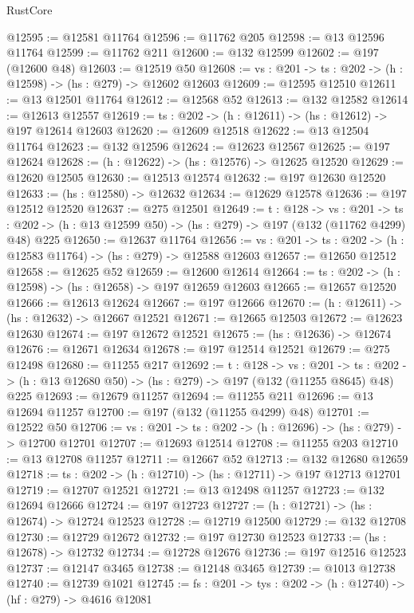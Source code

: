 \begin{lexlean}{RustCore}
\begin{coremodule}
@12595 := @12581 @11764
@12596 := @11762 @205
@12598 := @13 @12596 @11764
@12599 := @11762 @211
@12600 := @132 @12599
@12602 := @197 (@12600 @48)
@12603 := @12519 @50
@12608 := {vs : @201} -> {ts : @202} -> (h : @12598) -> (hs : @279) -> @12602 @12603
@12609 := @12595 @12510
@12611 := @13 @12501 @11764
@12612 := @12568 @52
@12613 := @132 @12582
@12614 := @12613 @12557
@12619 := {ts : @202} -> (h : @12611) -> (hs : @12612) -> @197 @12614 @12603
@12620 := @12609 @12518
@12622 := @13 @12504 @11764
@12623 := @132 @12596
@12624 := @12623 @12567
@12625 := @197 @12624
@12628 := (h : @12622) -> (hs : @12576) -> @12625 @12520
@12629 := @12620 @12505
@12630 := @12513 @12574
@12632 := @197 @12630 @12520
@12633 := (hs : @12580) -> @12632
@12634 := @12629 @12578
@12636 := @197 @12512 @12520
@12637 := @275 @12501
@12649 := {t : @128} ->
  {vs : @201} ->
  {ts : @202} -> (h : @13 @12599 @50) -> (hs : @279) -> @197 (@132 (@11762 @4299) @48) @225
@12650 := @12637 @11764
@12656 := {vs : @201} -> {ts : @202} -> (h : @12583 @11764) -> (hs : @279) -> @12588 @12603
@12657 := @12650 @12512
@12658 := @12625 @52
@12659 := @12600 @12614
@12664 := {ts : @202} -> (h : @12598) -> (hs : @12658) -> @197 @12659 @12603
@12665 := @12657 @12520
@12666 := @12613 @12624
@12667 := @197 @12666
@12670 := (h : @12611) -> (hs : @12632) -> @12667 @12521
@12671 := @12665 @12503
@12672 := @12623 @12630
@12674 := @197 @12672 @12521
@12675 := (hs : @12636) -> @12674
@12676 := @12671 @12634
@12678 := @197 @12514 @12521
@12679 := @275 @12498
@12680 := @11255 @217
@12692 := {t : @128} ->
  {vs : @201} ->
  {ts : @202} -> (h : @13 @12680 @50) -> (hs : @279) -> @197 (@132 (@11255 @8645) @48) @225
@12693 := @12679 @11257
@12694 := @11255 @211
@12696 := @13 @12694 @11257
@12700 := @197 (@132 (@11255 @4299) @48)
@12701 := @12522 @50
@12706 := {vs : @201} -> {ts : @202} -> (h : @12696) -> (hs : @279) -> @12700 @12701
@12707 := @12693 @12514
@12708 := @11255 @203
@12710 := @13 @12708 @11257
@12711 := @12667 @52
@12713 := @132 @12680 @12659
@12718 := {ts : @202} -> (h : @12710) -> (hs : @12711) -> @197 @12713 @12701
@12719 := @12707 @12521
@12721 := @13 @12498 @11257
@12723 := @132 @12694 @12666
@12724 := @197 @12723
@12727 := (h : @12721) -> (hs : @12674) -> @12724 @12523
@12728 := @12719 @12500
@12729 := @132 @12708
@12730 := @12729 @12672
@12732 := @197 @12730 @12523
@12733 := (hs : @12678) -> @12732
@12734 := @12728 @12676
@12736 := @197 @12516 @12523
@12737 := @12147 @3465
@12738 := @12148 @3465
@12739 := @1013 @12738
@12740 := @12739 @1021
@12745 := {fs : @201} -> {tys : @202} -> (h : @12740) -> (hf : @279) -> @4616 @12081

\end{coremodule}
\end{lexlean}
